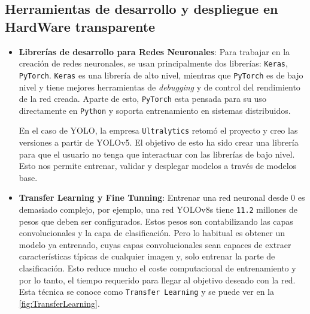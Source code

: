 \subsection{Herramientas de desarrollo y despliegue en HardWare transparente}

\begin{itemize}
    \item \textbf{Librerías de desarrollo para Redes Neuronales}: Para trabajar en la creación de redes neuronales, se usan principalmente dos librerías: \texttt{Keras}, \texttt{PyTorch}.
    \texttt{Keras} es una librería de alto nivel, mientras que \texttt{PyTorch} es de bajo nivel y tiene mejores herramientas de \textit{debugging} y de control del rendimiento de la red creada. 
    Aparte de esto, \texttt{PyTorch} esta pensada para su uso directamente en \texttt{Python} y soporta entrenamiento en sistemas distribuidos.


    En el caso de YOLO, la empresa \texttt{Ultralytics} retomó el proyecto y creo las versiones a partir de YOLOv5. El objetivo de esto ha sido crear una librería para 
    que el usuario no tenga que interactuar con las librerías de bajo nivel. Esto nos permite entrenar, validar y desplegar modelos a través de modelos base.
    \item \textbf{Transfer Learning y Fine Tunning}: Entrenar una red neuronal desde 0 es demasiado complejo, por ejemplo, una red YOLOv8s tiene \texttt{11.2} millones de pesos que 
    deben ser configurados. Estos pesos son contabilizando las capas convolucionales y la capa de clasificación.\newline
    Pero lo habitual es obtener un modelo ya entrenado, cuyas capas convolucionales sean capaces de extraer características típicas de cualquier imagen y, solo entrenar la parte de clasificación. 
    Esto reduce mucho el coste computacional de entrenamiento y por lo tanto, el tiempo requerido para llegar al objetivo deseado con la red. Esta técnica se conoce como \texttt{Transfer Learning} 
    y se puede ver en la \autoref{fig:TransferLearning}.
    

\end{itemize}
